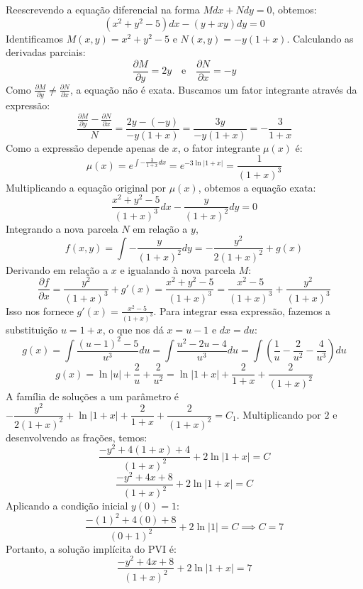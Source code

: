 \documentclass[oneside,12pt,a4paper]{report}
\begin{document}
\begin{resolucao}
        \itemresolucao Reescrevendo a equação diferencial na forma $Mdx+Ndy=0$, obtemos:
        \[(x^2+y^2-5)dx-(y+xy)dy=0\]
        Identificamos $M(x,y)=x^2+y^2-5$ e $N(x,y)=-y(1+x)$.
        Calculando as derivadas parciais:
        \[\frac{\partial M}{\partial y}=2y \quad \text{e} \quad \frac{\partial N}{\partial x}=-y\]
        Como $\frac{\partial M}{\partial y} \neq \frac{\partial N}{\partial x}$, a equação não é exata. Buscamos um fator integrante através da expressão:
        \[\frac{\frac{\partial M}{\partial y}-\frac{\partial N}{\partial x}}{N}=\frac{2y-(-y)}{-y(1+x)}=\frac{3y}{-y(1+x)}=-\frac{3}{1+x}\]
        Como a expressão depende apenas de $x$, o fator integrante $\mu(x)$ é:
        \[\mu(x)=e^{\int -\frac{3}{1+x} dx}=e^{-3\ln|1+x|}=\frac{1}{(1+x)^3}\]
        Multiplicando a equação original por $\mu(x)$, obtemos a equação exata:
        \[\frac{x^2+y^2-5}{(1+x)^3}dx-\frac{y}{(1+x)^2}dy=0\]
        Integrando a nova parcela $N$ em relação a $y$, 
        \[f(x,y)=\int -\frac{y}{(1+x)^2} dy=-\frac{y^2}{2(1+x)^2}+g(x)\]
        Derivando em relação a $x$ e igualando à nova parcela $M$:
        \[\frac{\partial f}{\partial x}=\frac{y^2}{(1+x)^3}+g'(x)=\frac{x^2+y^2-5}{(1+x)^3}=\frac{x^2-5}{(1+x)^3}+\frac{y^2}{(1+x)^3}\]
        Isso nos fornece $g'(x)=\frac{x^2-5}{(1+x)^3}$. Para integrar essa expressão, fazemos a substituição $u=1+x$, o que nos dá $x=u-1$ e $dx=du$:
        \[g(x)=\int \frac{(u-1)^2-5}{u^3} du=\int \frac{u^2-2u-4}{u^3} du=\int \left(\frac{1}{u}-\frac{2}{u^2}-\frac{4}{u^3}\right) du\]
        \[g(x)=\ln|u|+\frac{2}{u}+\frac{2}{u^2}=\ln|1+x|+\frac{2}{1+x}+\frac{2}{(1+x)^2}\]
        A família de soluções a um parâmetro é $-\dfrac{y^2}{2(1+x)^2}+\ln|1+x|+\dfrac{2}{1+x}+\dfrac{2}{(1+x)^2}=C_1$.
        Multiplicando por $2$ e desenvolvendo as frações, temos:
        \[\frac{-y^2+4(1+x)+4}{(1+x)^2}+2\ln|1+x|=C\]
        \[\frac{-y^2+4x+8}{(1+x)^2}+2\ln|1+x|=C\]
        Aplicando a condição inicial $y(0)=1$:
        \[\frac{-(1)^2+4(0)+8}{(0+1)^2}+2\ln|1|=C \implies C=7\]
        Portanto, a solução implícita do PVI é:
        \[\boxed{\frac{-y^2+4x+8}{(1+x)^2}+2\ln|1+x|=7}\]
    \end{resolucao}
\end{document}
